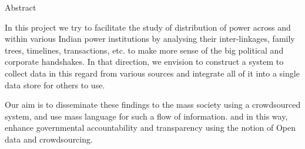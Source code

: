 \begin{center}
\LARGE{Abstract}
\end{center}

\vspace{0.5in}

In this project we try to facilitate the study of distribution of power across and within various Indian power institutions by analysing their inter-linkages, family trees, timelines, transactions, etc. to make more sense of the big political and corporate handshakes. In that direction, we envision to construct a system to collect data in this regard from various sources and integrate all of it into a single data store for others to use.

Our aim is to disseminate these findings to the mass society using a crowdsourced system, and use mass language for such a flow of information. and in this way, enhance governmental accountability and transparency using the notion of Open data and crowdsourcing.

